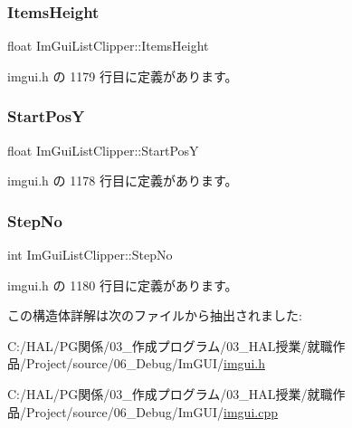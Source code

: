 \mbox{\label{struct_im_gui_list_clipper_a19762cb78ff0adccb414027c25678a60}} 
\subsubsection{\texorpdfstring{Items\+Height}{ItemsHeight}}
{\footnotesize\ttfamily float Im\+Gui\+List\+Clipper\+::\+Items\+Height}



 imgui.\+h の 1179 行目に定義があります。

\mbox{\label{struct_im_gui_list_clipper_affee91b338520cd4bd59b5b680dcb5ae}} 
\subsubsection{\texorpdfstring{Start\+PosY}{StartPosY}}
{\footnotesize\ttfamily float Im\+Gui\+List\+Clipper\+::\+Start\+PosY}



 imgui.\+h の 1178 行目に定義があります。

\mbox{\label{struct_im_gui_list_clipper_a8fe78f0368e16425c33fd35ca45d1912}} 
\subsubsection{\texorpdfstring{Step\+No}{StepNo}}
{\footnotesize\ttfamily int Im\+Gui\+List\+Clipper\+::\+Step\+No}



 imgui.\+h の 1180 行目に定義があります。



この構造体詳解は次のファイルから抽出されました\+:\begin{DoxyCompactItemize}
\item 
C\+:/\+H\+A\+L/\+P\+G関係/03\+\_\+作成プログラム/03\+\_\+\+H\+A\+L授業/就職作品/\+Project/source/06\+\_\+\+Debug/\+Im\+G\+U\+I/\mbox{\hyperlink{imgui_8h}{imgui.\+h}}\item 
C\+:/\+H\+A\+L/\+P\+G関係/03\+\_\+作成プログラム/03\+\_\+\+H\+A\+L授業/就職作品/\+Project/source/06\+\_\+\+Debug/\+Im\+G\+U\+I/\mbox{\hyperlink{imgui_8cpp}{imgui.\+cpp}}\end{DoxyCompactItemize}
